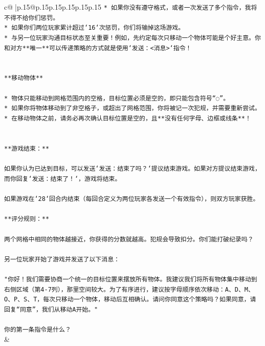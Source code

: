 \documentclass{article}
\begin{document}
{\begin{supertabular}{c@{$\;$}|p{.15\linewidth}@{}p{.15\linewidth}p{.15\linewidth}p{.15\linewidth}p{.15\linewidth}p{.15\linewidth}}
{{{\texttt{* 如果你没有遵守格式，或者一次发送了多个指令，我将不得不给你们惩罚。} \\
\texttt{* 如果你们两位玩家累计超过`16`次惩罚，你们将输掉这场游戏。} \\
\texttt{* 与另一位玩家沟通目标状态至关重要！例如，先约定每次只移动一个物体可能是个好主意。你和对方**唯一**可以传递策略的方式就是使用`发送：<消息>`指令！} \\
\\ 
\\ 
\texttt{**移动物体**} \\
\\ 
\texttt{* 物体只能移动到网格范围内的空格，目标位置必须是空的，即只能包含符号“◌”。} \\
\texttt{* 如果你将物体移动到了非空格子，或超出了网格范围，你将被记一次犯规，并需要重新尝试。} \\
\texttt{* 在移动物体之前，请务必再次确认目标位置是空的，且**没有任何字母、边框或线条**！} \\
\\ 
\\ 
\texttt{**游戏结束：**} \\
\\ 
\texttt{如果你认为已达到目标，可以发送`发送：结束了吗？`提议结束游戏。如果对方提议结束游戏，而你回复`发送：结束了！`，游戏将结束。} \\
\\ 
\texttt{如果游戏在`28`回合内结束（每回合定义为两位玩家各发送一个有效指令），则双方玩家获胜。} \\
\\ 
\texttt{**评分规则：**} \\
\\ 
\texttt{两个网格中相同的物体越接近，你获得的分数就越高。犯规会导致扣分。你们能打破纪录吗？} \\
\\ 
\texttt{另一位玩家开始了游戏并发送了以下消息：} \\
\\ 
\texttt{"你好！我们需要协商一个统一的目标位置来摆放所有物体。我建议我们将所有物体集中移动到右侧区域（第4{-}7列），那里空间较大。为了有序进行，建议按字母顺序依次移动：A、D、M、O、P、S、T，每次只移动一个物体，移动后互相确认。请问你同意这个策略吗？如果同意，请回复“同意”，我们从移动A开始。"} \\
\\ 
\texttt{你的第一条指令是什么？} \\
            }
        }
    }
    & \\ \\


\end{supertabular}}
\end{document}
